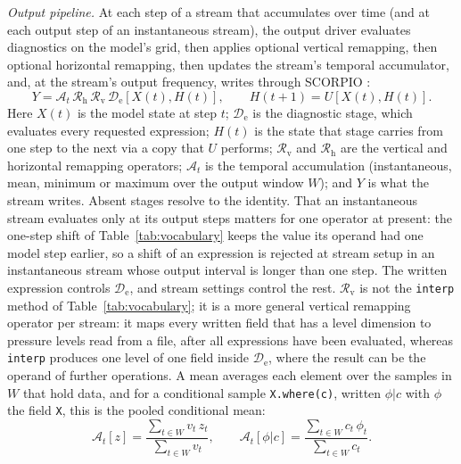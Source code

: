 \documentclass[gmd, manuscript]{copernicus}
\begin{document}
\emph{Output pipeline.} At each step of a stream that accumulates over time (and at each output step of an instantaneous stream), the output driver evaluates diagnostics on the model's grid, then applies optional vertical remapping, then optional horizontal remapping, then updates the stream's temporal accumulator, and, at the stream's output frequency, writes through SCORPIO \citep{krishna_scorpio_2025}:
\begin{equation}
  Y = \mathcal{A}_t\,\mathcal{R}_\text{h}\,\mathcal{R}_\text{v}\,\mathcal{D}_\text{e}[X(t),H(t)],
  \qquad
  H(t+1) = U[X(t),H(t)].
  \label{eq:pipeline}
\end{equation}
Here $X(t)$ is the model state at step $t$; $\mathcal{D}_\text{e}$ is the diagnostic stage, which evaluates every requested expression; $H(t)$ is the state that stage carries from one step to the next via a copy that $U$ performs; $\mathcal{R}_\text{v}$ and $\mathcal{R}_\text{h}$ are the vertical and horizontal remapping operators; $\mathcal{A}_t$ is the temporal accumulation (instantaneous, mean, minimum or maximum over the output window $W$); and $Y$ is what the stream writes. Absent stages resolve to the identity. That an instantaneous stream evaluates only at its output steps matters for one operator at present: the one-step shift of Table~\ref{tab:vocabulary} keeps the value its operand had one model step earlier, so a shift of an expression is rejected at stream setup in an instantaneous stream whose output interval is longer than one step. The written expression controls $\mathcal{D}_\text{e}$, and stream settings control the rest. $\mathcal{R}_\text{v}$ is not the \texttt{interp} method of Table~\ref{tab:vocabulary}; it is a more general vertical remapping operator per stream: it maps every written field that has a level dimension to pressure levels read from a file, after all expressions have been evaluated, whereas \texttt{interp} produces one level of one field inside $\mathcal{D}_\text{e}$, where the result can be the operand of further operations. A mean averages each element over the samples in $W$ that hold data, and for a conditional sample \texttt{X.where(c)}, written $\phi|c$ with $\phi$ the field \texttt{X}, this is the pooled conditional mean:
\begin{equation}
  \mathcal{A}_t[z] = \frac{\sum_{t\in W} v_t\,z_t}{\sum_{t\in W} v_t},
  \qquad
  \mathcal{A}_t[\phi|c] = \frac{\sum_{t\in W} c_t\,\phi_t}{\sum_{t\in W} c_t}.
  \label{eq:mean}
\end{equation}
\end{document}
